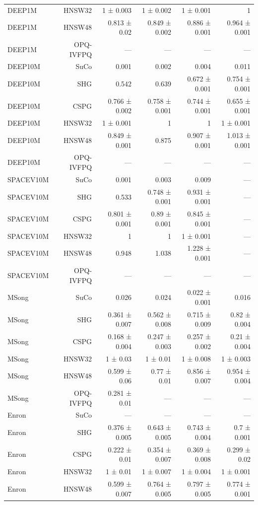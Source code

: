\begin{table}[t]
\begin{tabular}{lrrrrr}
DEEP1M & HNSW32 & 1 ± 0.003 & 1 ± 0.002 & 1 ± 0.001 & 1 \\
DEEP1M & HNSW48 & 0.813 ± 0.02 & 0.849 ± 0.002 & 0.886 ± 0.001 & 0.964 ± 0.001 \\
DEEP1M & OPQ-IVFPQ & — & — & — & — \\
DEEP10M & SuCo & 0.001 & 0.002 & 0.004 & 0.011 \\
DEEP10M & SHG & 0.542 & 0.639 & 0.672 ± 0.001 & 0.754 ± 0.001 \\
DEEP10M & CSPG & 0.766 ± 0.002 & 0.758 ± 0.001 & 0.744 ± 0.001 & 0.655 ± 0.001 \\
DEEP10M & HNSW32 & 1 ± 0.001 & 1 & 1 & 1 ± 0.001 \\
DEEP10M & HNSW48 & 0.849 ± 0.001 & 0.875 & 0.907 ± 0.001 & 1.013 ± 0.001 \\
DEEP10M & OPQ-IVFPQ & — & — & — & — \\
SPACEV10M & SuCo & 0.001 & 0.003 & 0.009 & — \\
SPACEV10M & SHG & 0.533 & 0.748 ± 0.001 & 0.931 ± 0.001 & — \\
SPACEV10M & CSPG & 0.801 ± 0.001 & 0.89 ± 0.001 & 0.845 ± 0.001 & — \\
SPACEV10M & HNSW32 & 1 & 1 & 1 ± 0.001 & — \\
SPACEV10M & HNSW48 & 0.948 & 1.038 & 1.228 ± 0.001 & — \\
SPACEV10M & OPQ-IVFPQ & — & — & — & — \\
MSong & SuCo & 0.026 & 0.024 & 0.022 ± 0.001 & 0.016 \\
MSong & SHG & 0.361 ± 0.007 & 0.562 ± 0.008 & 0.715 ± 0.009 & 0.82 ± 0.004 \\
MSong & CSPG & 0.168 ± 0.004 & 0.247 ± 0.003 & 0.257 ± 0.002 & 0.21 ± 0.004 \\
MSong & HNSW32 & 1 ± 0.03 & 1 ± 0.01 & 1 ± 0.008 & 1 ± 0.003 \\
MSong & HNSW48 & 0.599 ± 0.06 & 0.77 ± 0.01 & 0.856 ± 0.007 & 0.954 ± 0.004 \\
MSong & OPQ-IVFPQ & 0.281 ± 0.01 & — & — & — \\
Enron & SuCo & — & — & — & — \\
Enron & SHG & 0.376 ± 0.005 & 0.643 ± 0.005 & 0.743 ± 0.004 & 0.7 ± 0.001 \\
Enron & CSPG & 0.222 ± 0.01 & 0.354 ± 0.007 & 0.369 ± 0.008 & 0.299 ± 0.02 \\
Enron & HNSW32 & 1 ± 0.01 & 1 ± 0.007 & 1 ± 0.004 & 1 ± 0.001 \\
Enron & HNSW48 & 0.599 ± 0.007 & 0.764 ± 0.005 & 0.797 ± 0.005 & 0.774 ± 0.001 \\

\end{tabular}
\end{table}
